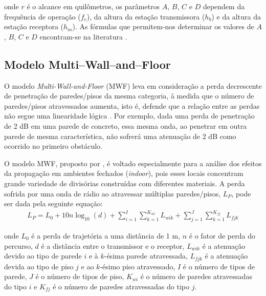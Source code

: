 \noindent onde $r$ é o alcance em quilômetros, os parâmetros $A$, $B$, $C$ e $D$ dependem da frequência de operação ($f_c$), da altura da estação transmissora ($h_b$) e da altura da estação receptora ($h_m$). As fórmulas que permitem-nos determinar os valores de $A$, $B$, $C$ e $D$ encontram-se na literatura \cite{haykin2008}.

\subsection{Modelo Multi--Wall--and--Floor}
\label{sub:modelo-MWF}

O modelo \emph{Multi-Wall-and-Floor} (MWF) leva em consideração a perda decrescente de penetração de paredes/pisos da mesma categoria, à medida que o número de paredes/pisos atravessados aumenta, isto é, defende que a relação entre as  perdas não segue uma linearidade lógica \cite{lott2001ieee}. Por exemplo, dada uma perda de penetração de 2 dB em uma parede de concreto, essa mesma onda, ao penetrar em outra parede de mesma característica, não sofrerá uma atenuação de 2 dB como ocorrido no primeiro obstáculo.

O modelo MWF, proposto por , é voltado especialmente para a análise dos efeitos da propagação em ambientes fechados (\textit{indoor}), pois esses locais concentram grande variedade de divisórias construídas com diferentes materiais. A perda sofrida por uma onda de rádio ao atravessar múltiplas paredes/pisos, $L_{P}$, pode ser dada pela seguinte equação:
\begin{equation}
	\begin{aligned}
	\label{eq:mwf}
		L_{P} = L_0 + 10n\log_{10}(d) + \sum_{i=1}^{I} \sum_{k=1}^{K_{wi}} L_{wik} + \sum_{j=1}^{J} \sum_{k=1}^{K_{fj}} L_{fjk}
	\end{aligned}
\end{equation}

\noindent onde $L_0$ é a perda de trajetória a uma distância de 1 m, $n$ é o fator de perda do percurso, $d$ é a distância entre o transmissor e o receptor, $L_{wik}$ é a atenuação devido ao tipo de parede $i$ e à $k$-ésima parede atravessada, $L_{fjk}$ é a atenuação devida ao tipo de piso $j$ e ao $k$-ésimo piso atravessado, $I$ é o número de tipos de parede, $J$ é o número de tipos de piso, $K_{wi}$ é o número de paredes atravessadas do tipo $i$ e $K_{fj}$ é o número de paredes atravessadas do tipo $j$.
